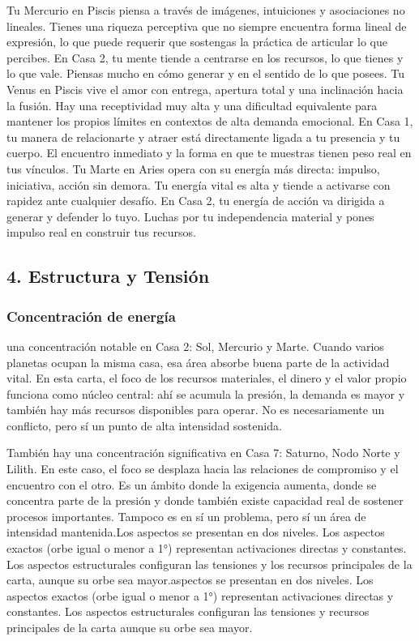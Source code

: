\documentclass[11pt,a4paper]{article}
\begin{document}
Tu Mercurio en Piscis piensa a través de imágenes, intuiciones y asociaciones no lineales. Tienes una riqueza perceptiva que no siempre encuentra forma lineal de expresión, lo que puede requerir que sostengas la práctica de articular lo que percibes. En Casa 2, tu mente tiende a centrarse en los recursos, lo que tienes y lo que vale. Piensas mucho en cómo generar y en el sentido de lo que posees. Tu Venus en Piscis vive el amor con entrega, apertura total y una inclinación hacia la fusión. Hay una receptividad muy alta y una dificultad equivalente para mantener los propios límites en contextos de alta demanda emocional. En Casa 1, tu manera de relacionarte y atraer está directamente ligada a tu presencia y tu cuerpo. El encuentro inmediato y la forma en que te muestras tienen peso real en tus vínculos. Tu Marte en Aries opera con su energía más directa: impulso, iniciativa, acción sin demora. Tu energía vital es alta y tiende a activarse con rapidez ante cualquier desafío. En Casa 2, tu energía de acción va dirigida a generar y defender lo tuyo. Luchas por tu independencia material y pones impulso real en construir tus recursos.

\subsection{4. Estructura y Tensión}

\subsubsection*{Concentración de energía}\nHay una concentración notable en Casa 2: Sol, Mercurio y Marte. Cuando varios planetas ocupan la misma casa, esa área absorbe buena parte de la actividad vital. En esta carta, el foco de los recursos materiales, el dinero y el valor propio funciona como núcleo central: ahí se acumula la presión, la demanda es mayor y también hay más recursos disponibles para operar. No es necesariamente un conflicto, pero sí un punto de alta intensidad sostenida.

También hay una concentración significativa en Casa 7: Saturno, Nodo Norte y Lilith. En este caso, el foco se desplaza hacia las relaciones de compromiso y el encuentro con el otro. Es un ámbito donde la exigencia aumenta, donde se concentra parte de la presión y donde también existe capacidad real de sostener procesos importantes. Tampoco es en sí un problema, pero sí un área de intensidad mantenida.Los aspectos se presentan en dos niveles. Los aspectos exactos (orbe igual o menor a 1°) representan activaciones directas y constantes. Los aspectos estructurales configuran las tensiones y los recursos principales de la carta, aunque su orbe sea mayor.\n\nLos aspectos se presentan en dos niveles.
Los aspectos exactos (orbe igual o menor a 1°) representan activaciones directas y constantes.
Los aspectos estructurales configuran las tensiones y recursos principales de la carta aunque su orbe sea mayor.
\end{document}
